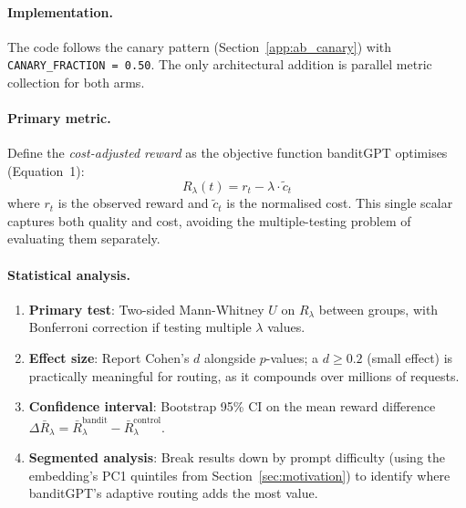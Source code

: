 \paragraph{Implementation.}
The code follows the canary pattern (Section~\ref{app:ab_canary}) with \texttt{CANARY\_FRACTION\,=\,0.50}.
The only architectural addition is parallel metric collection for both arms.

\paragraph{Primary metric.}
Define the \emph{cost-adjusted reward} as the objective function banditGPT optimises (Equation~1):
\begin{equation}
    R_{\lambda}(t) = r_t - \lambda \cdot \tilde{c}_t
    \label{eq:ab_metric}
\end{equation}
where $r_t$ is the observed reward and $\tilde{c}_t$ is the normalised cost.  This single scalar captures both quality and cost, avoiding the multiple-testing problem of evaluating them separately.

\paragraph{Statistical analysis.}
\begin{enumerate}[nosep,leftmargin=*]
    \item \textbf{Primary test}: Two-sided Mann-Whitney $U$ on $R_\lambda$ between groups, with Bonferroni correction if testing multiple $\lambda$ values.
    \item \textbf{Effect size}: Report Cohen's $d$ alongside $p$-values; a $d \geq 0.2$ (small effect) is practically meaningful for routing, as it compounds over millions of requests.
    \item \textbf{Confidence interval}: Bootstrap 95\% CI on the mean reward difference $\Delta \bar{R}_\lambda = \bar{R}_\lambda^{\mathrm{bandit}} - \bar{R}_\lambda^{\mathrm{control}}$.
    \item \textbf{Segmented analysis}: Break results down by prompt difficulty (using the embedding's PC1 quintiles from Section~\ref{sec:motivation}) to identify where banditGPT's adaptive routing adds the most value.
\end{enumerate}

